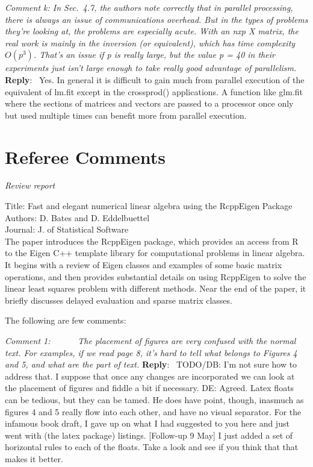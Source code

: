 \documentclass[10pt]{article}
\newcommand{\pointRaised}[2]{\smallskip %
  \textsl{{\fontseries{b}\selectfont #1}: #2}\newline}
\newcommand{\reply}[1]{\textbf{Reply}:\ #1 \smallskip } %
\begin{document}
\pointRaised{Comment k}{
  In Sec.~4.7, the authors note correctly that in parallel processing,
  there is always an issue of communications overhead. But in the types
  of problems they're looking at, the problems are especially acute. With
  an nxp X matrix, the real work is mainly in the inversion (or
  equivalent), which has time complexity $O(p^3)$. That's an issue if p is
  really large, but the value p = 40 in their experiments just isn't large
  enough to take really good advantage of parallelism.
}
\reply{
  Yes.  In general it is difficult to gain much from parallel
  execution of the equivalent of lm.fit except in the crossprod()
  applications.  A function like glm.fit where the sections of
  matrices and vectors are passed to a processor once only but used
  multiple times can benefit more from parallel execution.
}


\section*{Referee Comments}

{ \sl
  Review report

  Title: Fast and elegant numerical linear algebra using the RcppEigen Package \\
  Authors: D. Bates and D. Eddelbuettel \\
  Journal: J. of Statistical Software \\

  The paper introduces the RcppEigen package, which provides an
  access from R to the Eigen C++ template library for computational
  problems in linear algebra. It begins with a review of Eigen
  classes and examples of some basic matrix operations, and then
  provides substantial details on using RcppEigen to solve the
  linear least squares problem with different methods. Near the end
  of the paper, it briefly discusses delayed evaluation and sparse
  matrix classes. 

  The following are few comments: 
}


\pointRaised{Comment 1}{     
  The placement of figures are very confused with the normal text. 
  For examples, if we read page 8, it's hard to tell what belongs to 
  Figures 4 and 5, and what are the part of text. 
}
\reply{
  TODO/DB: I'm not sure how to address that.  I suppose that once any
  changes are incorporated we can look at the placement of figures
  and fiddle a bit if necessary.
  \newline
  DE: Agreed.  Latex floats can be tedious, but they can be tamed.  He does
  have point, though, inasmuch as figures 4 and 5 really flow into each
  other, and have no visual separator. For the infamous book draft, I gave up
  on what I had suggested to you here and just went with (the latex package)
  listings.   [Follow-up 9 May] I just added a set of horizontal rules to each
  of the floats.  Take a look and see if you think that that makes it better.
}
\end{document}
